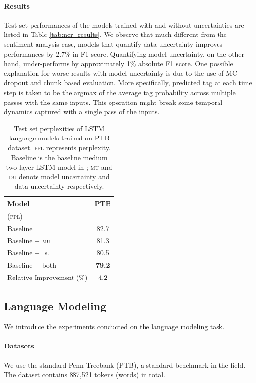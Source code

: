 \documentclass[letterpaper]{article} %
\begin{document}
\paragraph{Results}
Test set performances of the models trained with and without uncertainties are listed in Table \ref{tab:ner_results}. We observe that much different from the sentiment analysis case, models that quantify data uncertainty improves performances by 2.7\% in F1 score. Quantifying model uncertainty, on the other hand, under-performs by approximately 1\% absolute F1 score. One possible explanation for worse results with model uncertainty is due to the use of MC dropout and chunk based evaluation. More specifically, predicted tag at each time step is taken to be the argmax of the average tag probability across multiple passes with the same inputs. This operation might break some temporal dynamics captured with a single pass of the inputs.

\begin{table}[t!]
\begin{center}
\begin{tabular}{lc}
\hline
{\bf Model} & {\bf PTB}\\  \hline
(\textsc{ppl}) \\
Baseline & 82.7 \\
Baseline + \textsc{mu} & 81.3\\
Baseline + \textsc{du} & 80.5 \\
Baseline + both        & \bf 79.2 \\ \hline
Relative Improvement (\%) & 4.2 \\
\hline
\end{tabular}
\end{center}
\caption{\label{tab:lm_results}Test set perplexities of LSTM language models trained on PTB dataset. \textsc{ppl} represents perplexity. Baseline is the baseline medium two-layer LSTM model in \cite{zaremba2014recurrent}; \textsc{mu} and \textsc{du} denote model uncertainty and data uncertainty respectively.}
\end{table}

\subsection{Language Modeling}
We introduce the experiments conducted on the language modeling task. 

\paragraph{Datasets} We use the standard Penn Treebank (PTB), a standard benchmark in the field. The dataset contains 887,521 tokens (words) in total.
\end{document}

